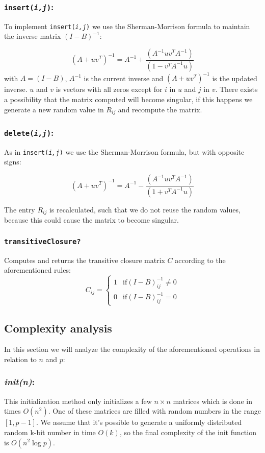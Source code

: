 \documentclass[a4paper,oneside,article]{memoir}
\begin{document}
\subsubsection{\texttt{insert(\textit{i,j})}:}
To implement \texttt{insert(\textit{i,j})} we use the Sherman-Morrison
formula to maintain the inverse matrix $(I - B)^{-1}$:

$$(A+uv^T)^{-1}=A^{-1} + \dfrac{(A^{-1}uv^TA^{-1})}{(1 -
  v^TA^{-1}u)}$$ with $A = (I - B)$, $A^{-1}$ is the current inverse
and $(A+uv^T)^{-1}$ is the updated inverse. $u$ and $v$ is vectors
with all zeros except for $i$ in $u$ and $j$ in $v$.  There exists a
possibility that the matrix computed will become singular, if this
happens we generate a new random value in $R_{ij}$ and recompute the
matrix.
\subsubsection{\texttt{delete(\textit{i,j})}:}
As in \texttt{insert(\textit{i,j})} we use the Sherman-Morrison
formula, but with opposite signs:

$$(A+uv^T)^{-1}=A^{-1} - \dfrac{(A^{-1}uv^TA^{-1})}{(1+v^TA^{-1}u)}$$

The entry $R_{ij}$ is recalculated, such that we do not reuse the
random values, because this could cause the matrix to become singular.

\subsubsection{\texttt{transitiveClosure?}}
Computes and returns the transitive closure matrix $C$ according to
the aforementioned rules:
$$C_{ij} =
\begin{cases}
  1 & \text{if} (I - B)^{-1}_{ij} \neq 0 \\
  0 & \text{if} (I - B)^{-1}_{ij} = 0
\end{cases}
$$
\newpage
\subsection{Complexity analysis}
In this section we will analyze the complexity of the aforementioned
operations in relation to $n$ and $p$:
\subsubsection{\textit{init(n)}:}
This initialization method only initializes a few $n\times n$
matrices which is done in times $O(n^2)$. One of these matrices are
filled with random numbers in the range $[1,p-1]$. We assume that it's
possible to generate a uniformly distributed random k-bit number in
time $O(k)$, so the final complexity of the init function is
$O(n^2\log p)$.
\end{document}
